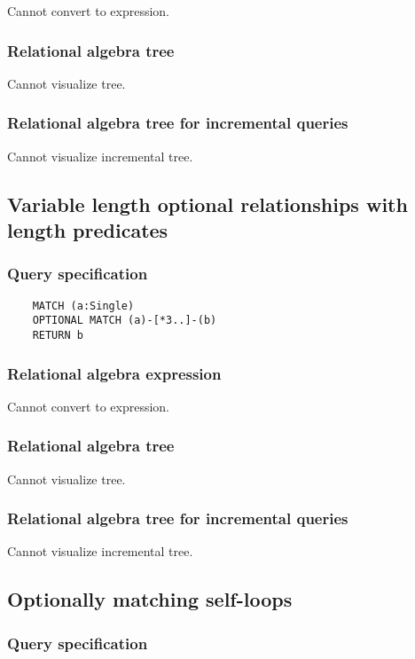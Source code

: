 	Cannot convert to expression.

	\subsubsection*{Relational algebra tree}

	Cannot visualize tree.

	\subsubsection*{Relational algebra tree for incremental queries}

	Cannot visualize incremental tree.
	\subsection{Variable length optional relationships with length predicates}

	\subsubsection*{Query specification}

	\begin{lstlisting}
	MATCH (a:Single)
	OPTIONAL MATCH (a)-[*3..]-(b)
	RETURN b
	\end{lstlisting}


	\subsubsection*{Relational algebra expression}

	Cannot convert to expression.

	\subsubsection*{Relational algebra tree}

	Cannot visualize tree.

	\subsubsection*{Relational algebra tree for incremental queries}

	Cannot visualize incremental tree.
	\subsection{Optionally matching self-loops}

	\subsubsection*{Query specification}

